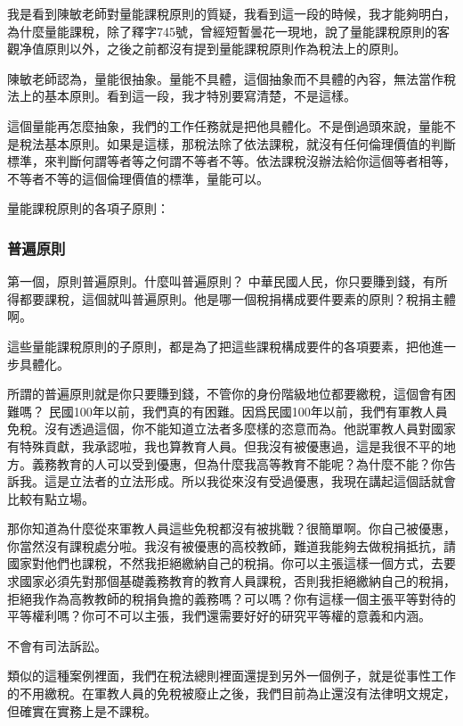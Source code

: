 \documentclass[oneside,sub3section]{ctexbook}
\begin{document}
我是看到陳敏老師對量能課稅原則的質疑，我看到這一段的時候，我才能夠明白，為什麼量能課稅，除了釋字745號，曾經短暫曇花一現地，說了量能課稅原則的客觀净值原則以外，之後之前都沒有提到量能課稅原則作為稅法上的原則。

陳敏老師認為，量能很抽象。量能不具體，這個抽象而不具體的內容，無法當作稅法上的基本原則。看到這一段，我才特別要寫清楚，不是這樣。

這個量能再怎麼抽象，我們的工作任務就是把他具體化。不是倒過頭來說，量能不是稅法基本原則。如果是這樣，那稅法除了依法課稅，就沒有任何倫理價值的判斷標準，來判斷何謂等者等之何謂不等者不等。依法課稅沒辦法給你這個等者相等，不等者不等的這個倫理價值的標準，量能可以。

量能課稅原則的各項子原則：

\hypertarget{ux666eux904dux539fux5247}{%
\subsubsection{普遍原則}\label{ux666eux904dux539fux5247}}

第一個，原則普遍原則。什麼叫普遍原則？ 中華民國人民，你只要賺到錢，有所得都要課稅，這個就叫普遍原則。他是哪一個稅捐構成要件要素的原則？稅捐主體啊。

這些量能課稅原則的子原則，都是為了把這些課稅構成要件的各項要素，把他進一步具體化。

所謂的普遍原則就是你只要賺到錢，不管你的身份階級地位都要繳稅，這個會有困難嗎？ 民國100年以前，我們真的有困難。因爲民國100年以前，我們有軍教人員免稅。沒有透過這個，你不能知道立法者多麼樣的恣意而為。他説軍教人員對國家有特殊貢獻，我承認啦，我也算教育人員。但我沒有被優惠過，這是我很不平的地方。義務教育的人可以受到優惠，但為什麼我高等教育不能呢？為什麼不能？你告訴我。這是立法者的立法形成。所以我從來沒有受過優惠，我現在講起這個話就會比較有點立場。

那你知道為什麼從來軍教人員這些免稅都沒有被挑戰？很簡單啊。你自己被優惠，你當然沒有課稅處分啦。我沒有被優惠的高校教師，難道我能夠去做稅捐抵抗，請國家對他們也課稅，不然我拒絕繳納自己的稅捐。你可以主張這樣一個方式，去要求國家必須先對那個基礎義務教育的教育人員課稅，否則我拒絕繳納自己的稅捐，拒絕我作為高教教師的稅捐負擔的義務嗎？可以嗎？你有這樣一個主張平等對待的平等權利嗎？你可不可以主張，我們還需要好好的研究平等權的意義和内涵。

不會有司法訴訟。

類似的這種案例裡面，我們在稅法總則裡面還提到另外一個例子，就是從事性工作的不用繳稅。在軍教人員的免稅被廢止之後，我們目前為止還沒有法律明文規定，但確實在實務上是不課稅。
\end{document}
